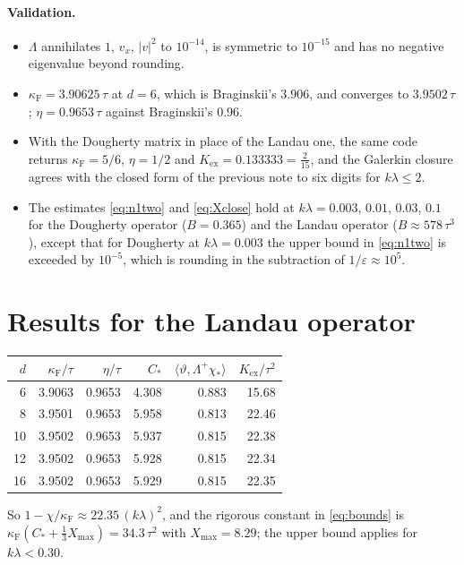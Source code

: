 \documentclass[11pt]{article}
\newcommand{\avg}[1]{\langle #1\rangle}
\theoremstyle{remark}
\begin{document}
\paragraph{Validation.}
\begin{itemize}
  \item $\Lambda$ annihilates $1$, $v_x$, $|v|^2$ to $10^{-14}$, is
    symmetric to $10^{-15}$ and has no negative eigenvalue beyond rounding.
  \item $\kappa_{\mathrm F}=3.90625\,\tau$ at $d=6$, which is Braginskii's
    $3.906$, and converges to $3.9502\,\tau$;
    $\eta=0.9653\,\tau$ against Braginskii's $0.96$.
  \item With the Dougherty matrix in place of the Landau one, the same code
    returns $\kappa_{\mathrm F}=5/6$, $\eta=1/2$ and
    $K_{\mathrm{ex}}=0.133333=\tfrac{2}{15}$, and the Galerkin closure agrees
    with the closed form of the previous note to six digits for
    $k\lambda\le2$.
  \item The estimates \eqref{eq:n1two} and \eqref{eq:Xclose} hold at
    $k\lambda=0.003$, $0.01$, $0.03$, $0.1$ for the Dougherty operator
    ($B=0.365$) and the Landau operator ($B\approx578\,\tau^3$), except that
    for Dougherty at $k\lambda=0.003$ the upper bound in \eqref{eq:n1two} is
    exceeded by $10^{-5}$, which is rounding in the subtraction of
    $1/\varepsilon\approx10^5$.
\end{itemize}

\section{Results for the Landau operator}

\begin{center}
\renewcommand{\arraystretch}{1.2}
\begin{tabular}{rrrrrr}
  $d$ & $\kappa_{\mathrm F}/\tau$ & $\eta/\tau$ & $C_*$
      & $\avg{\vartheta,\Lambda^+\chi_*}$ & $K_{\mathrm{ex}}/\tau^2$ \\ \hline
  6  & 3.9063 & 0.9653 & 4.308 & 0.883 & 15.68 \\
  8  & 3.9501 & 0.9653 & 5.958 & 0.813 & 22.46 \\
  10 & 3.9502 & 0.9653 & 5.937 & 0.815 & 22.38 \\
  12 & 3.9502 & 0.9653 & 5.928 & 0.815 & 22.34 \\
  16 & 3.9502 & 0.9653 & 5.929 & 0.815 & 22.35 \\
\end{tabular}
\end{center}
So $1-\chi/\kappa_{\mathrm F}\approx22.35\,(k\lambda)^2$, and the rigorous
constant in \eqref{eq:bounds} is
$\kappa_{\mathrm F}(C_*+\tfrac13X_{\max})=34.3\,\tau^2$ with
$X_{\max}=8.29$; the upper bound applies for $k\lambda<0.30$.
\end{document}
